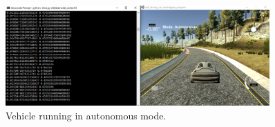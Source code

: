 \documentclass{article}
\begin{document}
\begin{figure}[H]
\centering
\includegraphics[width=0.9\textwidth]{demo.PNG}
\caption{Vehicle running in autonomous mode.}
\label{fig: cnn}
\end{figure} 
\end{document}
